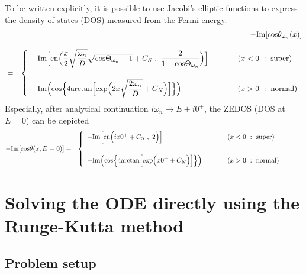 \documentclass[uplatex,a4j,12pt,dvipdfmx]{jsarticle}
\begin{document}
To be written explicitly,
it is possible to use Jacobi's elliptic functions to express
the density of states (DOS) measured from the Fermi energy.
\begin{eqnarray}
	&&
	- {\rm Im}[{\rm cos}\theta_{\omega_{n}}(x)]
	\nonumber \\[3mm]
	&=&
	\left\{
	\begin{array}{ll}
		-{\rm Im} \Big[
			{\rm cn}
			\Big(
			\dfrac{x}{2}
			\sqrt{ \dfrac{ \omega_{n} }{ D } }
			\sqrt{ {\rm cos} \Theta_{\omega_{n}} - 1 }
			+
			C_{S}
			\ , \
			\dfrac{2}{ 1 - {\rm cos} \Theta_{\omega_{n}} }
			\Big)
			\Big]
		 &
		\hspace{10mm}
		(x<0 \ : \ {\rm super})
		\\[7mm]
		-{\rm Im} \Big(
		{\rm cos}
		\Big\{
		4
		{\rm arctan}
		\Big[
			{\rm exp}
			\Big(
			2x
			\sqrt{ \dfrac{2 \omega_{n} }{ D } }
			+
			C_{N}
			\Big)
			\Big]
		\Big\}
		\Big)
		 &
		\hspace{10mm}
		(x>0 \ : \ {\rm normal})
	\end{array}
	\right.
\end{eqnarray}
Especially, after analytical continuation $i \omega_{n} \to E + i 0^{+}$,
the ZEDOS (DOS at $E=0$) can be depicted
\begin{eqnarray}
	- {\rm Im}[{\rm cos}\theta(x,E=0)]
	&=&
	\left\{
	\begin{array}{ll}
		-{\rm Im} \Big[
			{\rm cn}
			\Big(
			i x 0^{+}
			+
			C_{S}
			\ , \
			2
			\Big)
			\Big]
		 &
		\hspace{10mm}
		(x<0 \ : \ {\rm super})
		\\[7mm]
		-{\rm Im} \Big(
		{\rm cos}
		\Big\{
		4
		{\rm arctan}
		\Big[
			{\rm exp}
			\Big(
			x
			0^{+}
			+
			C_{N}
			\Big)
			\Big]
		\Big\}
		\Big)
		 &
		\hspace{10mm}
		(x>0 \ : \ {\rm normal} )
	\end{array}
	\right.
	\hspace{10mm}
\end{eqnarray}

\section{Solving the ODE directly using the Runge-Kutta method}

\subsection{Problem setup}
\end{document}

